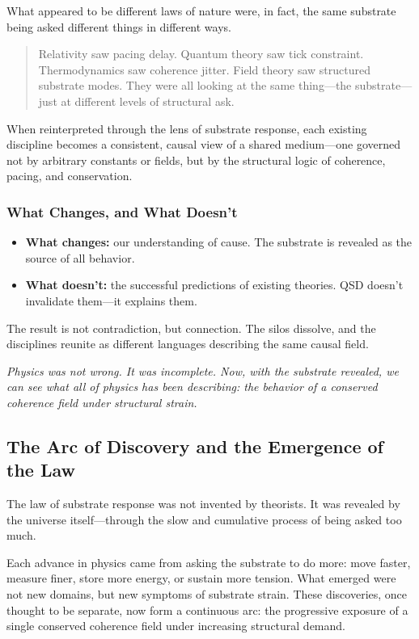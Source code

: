 \documentclass[entropy,article,submit,pdftex,moreauthors]{Definitions/mdpi}
\begin{document}
What appeared to be different laws of nature were, in fact, the same substrate being asked different things in different ways.

\begin{quote}
Relativity saw pacing delay. Quantum theory saw tick constraint. Thermodynamics saw coherence jitter. Field theory saw structured substrate modes. They were all looking at the same thing—the substrate—just at different levels of structural ask.
\end{quote}

When reinterpreted through the lens of substrate response, each existing discipline becomes a consistent, causal view of a shared medium—one governed not by arbitrary constants or fields, but by the structural logic of coherence, pacing, and conservation.

\subsubsection*{What Changes, and What Doesn’t}

\begin{itemize}
    \item \textbf{What changes:} our understanding of cause. The substrate is revealed as the source of all behavior.
    \item \textbf{What doesn’t:} the successful predictions of existing theories. QSD doesn’t invalidate them—it explains them.
\end{itemize}

The result is not contradiction, but connection. The silos dissolve, and the disciplines reunite as different languages describing the same causal field.

\vspace{1em}
\textit{Physics was not wrong. It was incomplete. Now, with the substrate revealed, we can see what all of physics has been describing: the behavior of a conserved coherence field under structural strain.}

\subsection{The Arc of Discovery and the Emergence of the Law}

The law of substrate response was not invented by theorists. It was revealed by the universe itself—through the slow and cumulative process of being asked too much.

Each advance in physics came from asking the substrate to do more: move faster, measure finer, store more energy, or sustain more tension. What emerged were not new domains, but new symptoms of substrate strain. These discoveries, once thought to be separate, now form a continuous arc: the progressive exposure of a single conserved coherence field under increasing structural demand.
\end{document}
